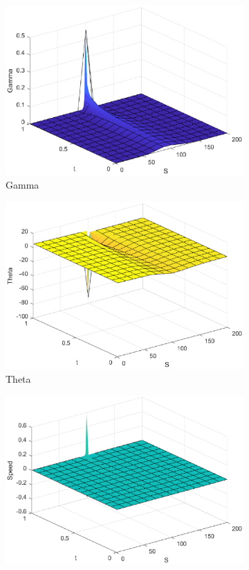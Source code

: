 \begin{figure}[H]
\begin{subfigure}[b]{0.35\linewidth}
        \includegraphics[width=\linewidth]{Imagenes/Parte1/6_Sols/Put/Put_Gamma.eps}
        \caption{Gamma}
    \end{subfigure}
    \begin{subfigure}[b]{0.35\linewidth}
        \includegraphics[width=\linewidth]{Imagenes/Parte1/6_Sols/Put/Put_Theta.eps}
        \caption{Theta}
    \end{subfigure}
    \begin{subfigure}[b]{0.35\linewidth}
        \includegraphics[width=\linewidth]{Imagenes/Parte1/6_Sols/Put/Put_Speed.eps}

\end{subfigure}
\end{figure}
